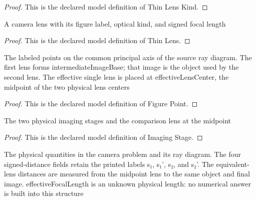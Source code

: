 \begin{proof}
  This is the declared model definition of Thin Lens Kind.
\end{proof}
\begin{definition}
  \label{def:physics:phyx-mini-0165:phyxminiproblems-problemphyxmini0165-thinlens}
  A camera lens with its figure label, optical kind, and signed focal length
\end{definition}
\begin{proof}
  This is the declared model definition of Thin Lens.
\end{proof}
\begin{definition}
  \label{def:physics:phyx-mini-0165:phyxminiproblems-problemphyxmini0165-figurepoint}
  The labeled points on the common principal axis of the source ray diagram. The first lens forms intermediateImageBase; that image is the object used by the second lens. The effective single lens is placed at effectiveLensCenter, the midpoint of the two physical lens centers
\end{definition}
\begin{proof}
  This is the declared model definition of Figure Point.
\end{proof}
\begin{definition}
  \label{def:physics:phyx-mini-0165:phyxminiproblems-problemphyxmini0165-imagingstage}
  The two physical imaging stages and the comparison lens at the midpoint
\end{definition}
\begin{proof}
  This is the declared model definition of Imaging Stage.
\end{proof}
\begin{definition}
  \label{def:physics:phyx-mini-0165:phyxminiproblems-problemphyxmini0165-twolenscamerasetup}
  The physical quantities in the camera problem and its ray diagram. The four signed-distance fields retain the printed labels s₁, s₁', s₂, and s₂'. The equivalent-lens distances are measured from the midpoint lens to the same object and final image. effectiveFocalLength is an unknown physical length: no numerical answer is built into this structure
\end{definition}
